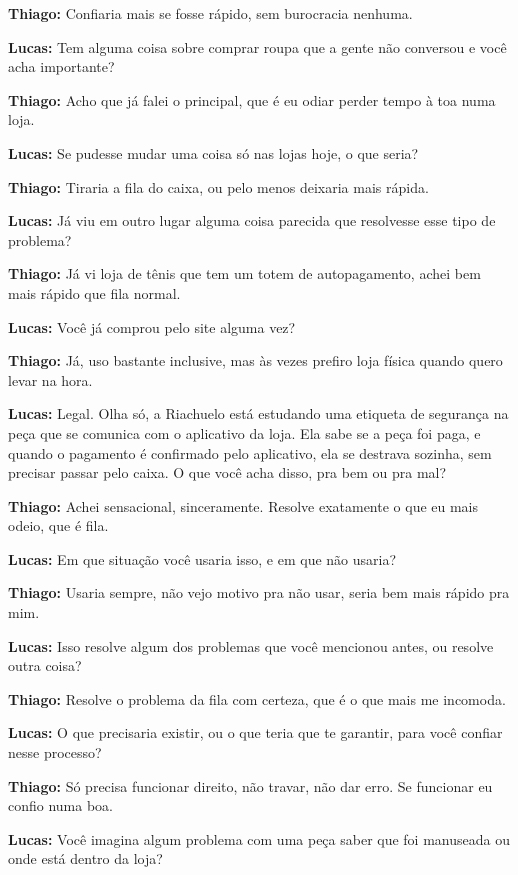 \textbf{Thiago:} Confiaria mais se fosse rápido, sem burocracia nenhuma.

\textbf{Lucas:} Tem alguma coisa sobre comprar roupa que a gente não conversou e você acha importante?

\textbf{Thiago:} Acho que já falei o principal, que é eu odiar perder tempo à toa numa loja.

\textbf{Lucas:} Se pudesse mudar uma coisa só nas lojas hoje, o que seria?

\textbf{Thiago:} Tiraria a fila do caixa, ou pelo menos deixaria mais rápida.

\textbf{Lucas:} Já viu em outro lugar alguma coisa parecida que resolvesse esse tipo de problema?

\textbf{Thiago:} Já vi loja de tênis que tem um totem de autopagamento, achei bem mais rápido que fila normal.

\textbf{Lucas:} Você já comprou pelo site alguma vez?

\textbf{Thiago:} Já, uso bastante inclusive, mas às vezes prefiro loja física quando quero levar na hora.

\textbf{Lucas:} Legal. Olha só, a Riachuelo está estudando uma etiqueta de segurança na peça que se comunica com o aplicativo da loja. Ela sabe se a peça foi paga, e quando o pagamento é confirmado pelo aplicativo, ela se destrava sozinha, sem precisar passar pelo caixa. O que você acha disso, pra bem ou pra mal?

\textbf{Thiago:} Achei sensacional, sinceramente. Resolve exatamente o que eu mais odeio, que é fila.

\textbf{Lucas:} Em que situação você usaria isso, e em que não usaria?

\textbf{Thiago:} Usaria sempre, não vejo motivo pra não usar, seria bem mais rápido pra mim.

\textbf{Lucas:} Isso resolve algum dos problemas que você mencionou antes, ou resolve outra coisa?

\textbf{Thiago:} Resolve o problema da fila com certeza, que é o que mais me incomoda.

\textbf{Lucas:} O que precisaria existir, ou o que teria que te garantir, para você confiar nesse processo?

\textbf{Thiago:} Só precisa funcionar direito, não travar, não dar erro. Se funcionar eu confio numa boa.

\textbf{Lucas:} Você imagina algum problema com uma peça saber que foi manuseada ou onde está dentro da loja?

